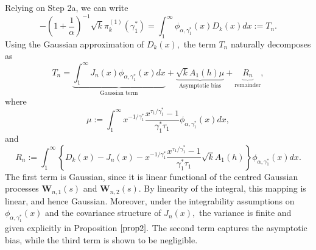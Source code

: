 \documentclass[reqno,openbib,runningheads,a4paper,12pt]{amsart}%
\begin{document}
\noindent Relying on Step 2a, we can write
\[
-\left(  1+\frac{1}{\alpha}\right)  ^{-1}\sqrt{k}\pi_{k}^{\left(  1\right)
}\left(  \gamma_{1}^{\ast}\right)  =\int_{1}^{\infty}\phi_{\alpha,\gamma
_{1}^{\ast}}\left(  x\right)  D_{k}\left(  x\right)  dx:=T_{n}.
\]
Using the Gaussian approximation of $D_{k}\left(  x\right)  ,$ the term
$T_{n}$ naturally decomposes as \textbf{ }%
\[
T_{n}=\underbrace{\int_{1}^{\infty}J_{n}\left(  x\right)  \phi_{\alpha
,\gamma_{1}^{\ast}}\left(  x\right)  dx}_{\text{Gaussian term}}%
+\underbrace{\sqrt{k}A_{1}\left(  h\right)  \mu}_{\text{Asymptotic bias}%
}+\underbrace{R_{n}}_{\text{remainder}},
\]
where%
\[
\mu:=\int_{1}^{\infty}x^{-1/\gamma_{1}^{\ast}}\frac{x^{\tau_{1}/\gamma
_{1}^{\ast}}-1}{\gamma_{1}^{\ast}\tau_{1}}\phi_{\alpha,\gamma_{1}^{\ast}%
}\left(  x\right)  dx,
\]
and
\[
R_{n}:=\int_{1}^{\infty}\left\{  D_{k}\left(  x\right)  -J_{n}\left(
x\right)  -x^{-1/\gamma_{1}^{\ast}}\frac{x^{\tau_{1}/\gamma_{1}^{\ast}}%
-1}{\gamma_{1}^{\ast}\tau_{1}}\sqrt{k}A_{1}\left(  h\right)  \right\}
\phi_{\alpha,\gamma_{1}^{\ast}}\left(  x\right)  dx.
\]
The first term is Gaussian, since it is linear functional of the centred
Gaussian processes $\mathbf{W}_{n,1}\left(  s\right)  $ and $\mathbf{W}%
_{n,2}\left(  s\right)  .$ By linearity of the integral, this mapping is
linear, and hence Gaussian. Moreover, under the integrability assumptions on
$\phi_{\alpha,\gamma_{1}^{\ast}}\left(  x\right)  $ and the covariance
structure of $J_{n}\left(  x\right)  ,$ the variance is finite and given
explicitly in Proposition $\ref{prop2}.$ The second term captures the
asymptotic bias, while the third term is shown to be negligible.\smallskip\ 
\end{document}
